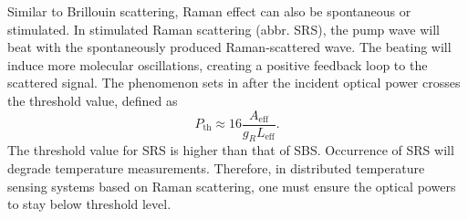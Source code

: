 \documentclass{standalone}
\begin{document}
Similar to Brillouin scattering, Raman effect can also be spontaneous or stimulated. In stimulated Raman scattering (abbr. SRS), the pump wave will beat with the spontaneously produced Raman-scattered wave. The beating will induce more molecular oscillations, creating a positive feedback loop to the scattered signal. The phenomenon sets in after the incident optical power crosses the threshold value, defined as
\begin{equation} \label{eq:raman_threshold}
P_\textrm{th} \approx 16 \frac{A_\textrm{eff}}{g_R L_\textrm{eff}} \textrm{.}
\end{equation}
The threshold value for SRS is higher than that of SBS. Occurrence of SRS will degrade temperature measurements. Therefore, in distributed temperature sensing systems based on Raman scattering, one must ensure the optical powers to stay below threshold level.




\setcounter{stranica}{\thepage}
\addtocounter{stranica}{1}
\end{document}
